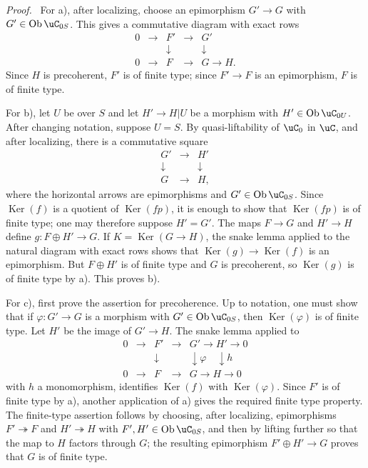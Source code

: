 \documentclass[11pt]{article}
\theoremstyle{plain}
\theoremstyle{definition}
\theoremstyle{remark}
\newenvironment{prooftext}{\par\noindent\textit{Proof.}\ }{\par\medskip}
\DeclareMathOperator{\Ker}{Ker}
\DeclareMathOperator{\ob}{Ob}
\begin{document}
\begin{prooftext}
For a), after localizing, choose an epimorphism $G'\to G$ with $G'\in\ob\uC_{0S}$. This gives a commutative diagram with exact rows
\[
\begin{array}{ccccc}
0&\longrightarrow&F'&\longrightarrow&G'\\
&&\downarrow&&\downarrow\\
0&\longrightarrow&F&\longrightarrow&G\longrightarrow H.
\end{array}
\]
Since $H$ is precoherent, $F'$ is of finite type; since $F'\to F$ is an epimorphism, $F$ is of finite type.

For b), let $U$ be over $S$ and let $H'\to H|U$ be a morphism with $H'\in\ob\uC_{0U}$. After changing notation, suppose $U=S$. By quasi-liftability of $\uC_0$ in $\uC$, and after localizing, there is a commutative square
\[
\begin{array}{ccc}
G'&\longrightarrow&H'\\
\downarrow&&\downarrow\\
G&\longrightarrow&H,
\end{array}
\]
where the horizontal arrows are epimorphisms and $G'\in\ob\uC_{0S}$. Since $\Ker(f)$ is a quotient of $\Ker(fp)$, it is enough to show that $\Ker(fp)$ is of finite type; one may therefore suppose $H'=G'$. The maps $F\to G$ and $H'\to H$ define $g:F\oplus H'\to G$. If $K=\Ker(G\to H)$, the snake lemma applied to the natural diagram with exact rows shows that $\Ker(g)\to\Ker(f)$ is an epimorphism. But $F\oplus H'$ is of finite type and $G$ is precoherent, so $\Ker(g)$ is of finite type by a). This proves b).

For c), first prove the assertion for precoherence. Up to notation, one must show that if $\varphi:G'\to G$ is a morphism with $G'\in\ob\uC_{0S}$, then $\Ker(\varphi)$ is of finite type. Let $H'$ be the image of $G'\to H$. The snake lemma applied to
\[
\begin{array}{ccccc}
0&\longrightarrow&F'&\longrightarrow&G'\longrightarrow H'\longrightarrow0\\
&&\downarrow&&\downarrow\varphi\quad\downarrow h\\
0&\longrightarrow&F&\longrightarrow&G\longrightarrow H\longrightarrow0
\end{array}
\]
with $h$ a monomorphism, identifies $\Ker(f)$ with $\Ker(\varphi)$. Since $F'$ is of finite type by a), another application of a) gives the required finite type property. The finite-type assertion follows by choosing, after localizing, epimorphisms $F'\twoheadrightarrow F$ and $H'\twoheadrightarrow H$ with $F',H'\in\ob\uC_{0S}$, and then by lifting further so that the map to $H$ factors through $G$; the resulting epimorphism $F'\oplus H'\to G$ proves that $G$ is of finite type.
\end{prooftext}
\end{document}
